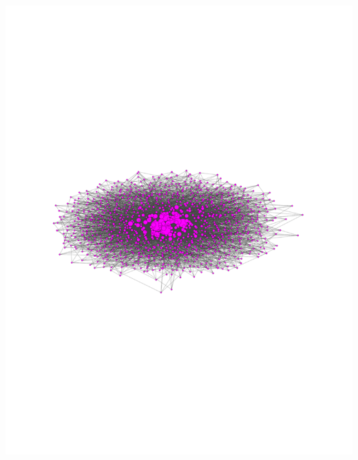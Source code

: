 \documentclass[landscape,paperwidth=70in,paperheight=46in,fontscale=0.225]{baposter} %
\begin{document}
\begin{poster}
{\begin{minipage}{0.3\linewidth}
\hspace*{-0.25in}
\includegraphics[scale=0.3]{figures/graph_nodes.pdf}

\end{minipage}
\hfill
\begin{minipage}{0.3\linewidth}



\end{minipage}}
\end{poster}
\end{document}

